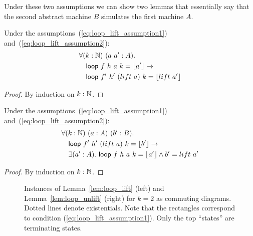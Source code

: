 Under these two assumptions we can show two lemmas that essentially say that the second abstract machine $B$ simulates the first machine $A$.
\begin{lemma}
  \label{lem:loop_lift}
  Under the assumptions~(\ref{eq:loop_lift_assumption1}) and~(\ref{eq:loop_lift_assumption2}):
  \begin{alignat*}{1}
    & \forall (k:\mathbb{N})~(a~a' : A). \\
    & \quad \mathsf{loop}~f ~h ~a        ~k = \left\lfloor {a'} \right\rfloor \rightarrow \\
    & \quad \mathsf{loop}~f'~h'~(lift~a) ~k = \left\lfloor {lift~a'} \right\rfloor
  \end{alignat*}
\end{lemma}
\begin{proof}
  By induction on $k:\mathbb{N}$.
\end{proof}
\begin{lemma}
  \label{lem:loop_unlift}
  Under the assumptions~(\ref{eq:loop_lift_assumption1}) and~(\ref{eq:loop_lift_assumption2}):
  \begin{alignat*}{1}
    & \forall (k:\mathbb{N})~(a:A)~(b':B). \\
    & \quad \mathsf{loop}~f'~h'~(lift~a)~k = \left\lfloor {b'} \right\rfloor \rightarrow \\
    & \quad \exists (a':A).~\mathsf{loop}~f~h~a~k = \left\lfloor {a'} \right\rfloor \land b'=lift~a'
  \end{alignat*}
\end{lemma}
\begin{proof}
  By induction on $k:\mathbb{N}$.
\end{proof}

\begin{figure}
  \center
  \hspace{1cm}
  \caption{Instances of Lemma~\ref{lem:loop_lift} (left) and Lemma~\ref{lem:loop_unlift} (right) for $k=2$ as commuting diagrams.  Dotted lines denote
    existentials.  Note that the rectangles correspond to condition (\ref{eq:loop_lift_assumption1}).  Only the top ``states'' are terminating
    states.}
  \label{fig:loop_lift_lemmas}
\end{figure}

